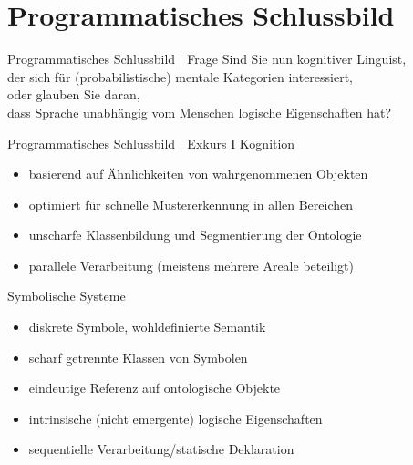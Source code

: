 \section{Programmatisches Schlussbild}

\begin{frame}
  {Programmatisches Schlussbild | Frage}
  \onslide<+->
  \onslide<+->
  \centering\large
  Sind Sie nun kognitiver Linguist,\\
  der sich für (probabilistische) \alert{mentale Kategorien} interessiert,\\
  \Halbzeile
  \onslide<+->
  oder glauben Sie daran,\\
  dass Sprache \alert{unabhängig vom Menschen logische Eigenschaften} hat?\\
  \onslide<+->
  \Zeile
\end{frame}

\begin{frame}
  {Programmatisches Schlussbild | Exkurs I}
  \onslide<+->
  \onslide<+->
  \alert{Kognition}\\
  \Viertelzeile
  \begin{itemize}[<+->]
    \item basierend auf Ähnlichkeiten von wahrgenommenen Objekten
    \item optimiert für schnelle Mustererkennung \alert{in allen Bereichen}
    \item unscharfe Klassenbildung und Segmentierung der Ontologie
    \item parallele Verarbeitung (meistens mehrere Areale beteiligt)
  \end{itemize}
  \Halbzeile 
  \onslide<+->
  \alert{Symbolische Systeme}\\
  \Viertelzeile
  \begin{itemize}[<+->]
    \item diskrete Symbole, wohldefinierte Semantik
    \item scharf getrennte Klassen von Symbolen
    \item eindeutige Referenz auf ontologische Objekte
    \item intrinsische (nicht emergente) logische Eigenschaften\\
    \item sequentielle Verarbeitung\slash statische Deklaration\\
  \end{itemize}
\end{frame}

